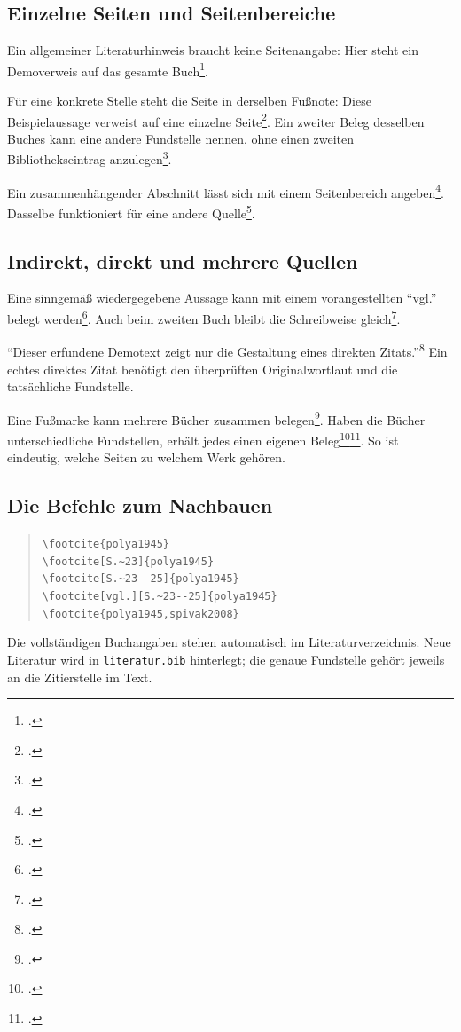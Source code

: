 \documentclass[12pt,a4paper,ngerman]{scrartcl}
\theoremstyle{definition}
\begin{document}
\subsection{Einzelne Seiten und Seitenbereiche}
Ein allgemeiner Literaturhinweis braucht keine Seitenangabe: Hier steht ein
Demoverweis auf das gesamte Buch\footcite{polya1945}.

Für eine konkrete Stelle steht die Seite in derselben Fußnote: Diese
Beispielaussage verweist auf eine einzelne Seite\footcite[S.~23]{polya1945}.
Ein zweiter Beleg desselben Buches kann eine andere Fundstelle nennen,
ohne einen zweiten Bibliothekseintrag anzulegen\footcite[S.~42]{polya1945}.

Ein zusammenhängender Abschnitt lässt sich mit einem Seitenbereich
angeben\footcite[S.~23--25]{polya1945}. Dasselbe funktioniert für eine
andere Quelle\footcite[S.~10--12]{spivak2008}.

\subsection{Indirekt, direkt und mehrere Quellen}
Eine sinngemäß wiedergegebene Aussage kann mit einem vorangestellten
\enquote{vgl.} belegt werden\footcite[vgl.][S.~23--25]{polya1945}.
Auch beim zweiten Buch bleibt die Schreibweise gleich\footcite[vgl.][S.~15]{spivak2008}.

\enquote{Dieser erfundene Demotext zeigt nur die Gestaltung eines direkten
Zitats.}\footcite[S.~23]{polya1945}
Ein echtes direktes Zitat benötigt den überprüften Originalwortlaut und die
tatsächliche Fundstelle.

Eine Fußmarke kann mehrere Bücher zusammen belegen\footcite{polya1945,spivak2008}.
Haben die Bücher unterschiedliche Fundstellen, erhält jedes einen eigenen
Beleg\footcite[S.~23]{polya1945}\footcite[S.~10--12]{spivak2008}.
So ist eindeutig, welche Seiten zu welchem Werk gehören.

\subsection{Die Befehle zum Nachbauen}
\begin{quote}
\small
\verb|\footcite{polya1945}|\\
\verb|\footcite[S.~23]{polya1945}|\\
\verb|\footcite[S.~23--25]{polya1945}|\\
\verb|\footcite[vgl.][S.~23--25]{polya1945}|\\
\verb|\footcite{polya1945,spivak2008}|
\end{quote}
Die vollständigen Buchangaben stehen automatisch im Literaturverzeichnis.
Neue Literatur wird in \texttt{literatur.bib} hinterlegt; die genaue Fundstelle
gehört jeweils an die Zitierstelle im Text.
\end{document}
